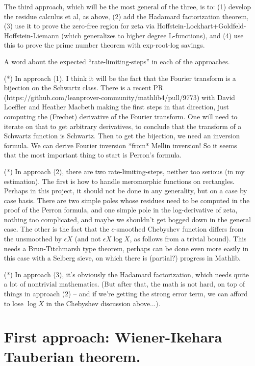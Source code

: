 The third approach, which will be the most general of the three, is to: (1) develop the residue calculus et al, as above, (2) add the Hadamard factorization theorem, (3) use it to prove the zero-free region for zeta via Hoffstein-Lockhart+Goldfeld-Hoffstein-Liemann (which generalizes to higher degree L-functions), and (4) use this to prove the prime number theorem with exp-root-log savings.

A word about the expected ``rate-limiting-steps'' in each of the approaches. 

(*) In approach (1), I think it will be the fact that the Fourier transform is a bijection on the Schwartz class. There is a recent PR (https://github.com/leanprover-community/mathlib4/pull/9773) with David Loeffler and Heather Macbeth making the first steps in that direction, just computing the (Frechet) derivative of the Fourier transform. One will need to iterate on that to get arbitrary derivatives, to conclude that the transform of a Schwartz function is Schwartz. Then to get the bijection, we need an inversion formula. We can derive Fourier inversion *from* Mellin inversion! So it seems that the most important thing to start is Perron's formula.

(*) In approach (2), there are two rate-limiting-steps, neither too serious (in my estimation). The first is how to handle meromorphic functions on rectangles. Perhaps in this project, it should not be done in any generality, but on a case by case basis. There are two simple poles whose residues need to be computed in the proof of the Perron formula, and one simple pole in the log-derivative of zeta, nothing too complicated, and maybe we shouldn't get bogged down in the general case. The other is the fact that the $\epsilon$-smoothed Chebyshev function differs from the unsmoothed by $\epsilon X$ (and not $\epsilon X \log X$, as follows from a trivial bound). This needs a Brun-Titchmarsh type theorem, perhaps can be done even more easily in this case with a Selberg sieve, on which there is (partial?) progress in Mathlib.

(*) In approach (3), it's obviously the Hadamard factorization, which needs quite a lot of nontrivial mathematics. (But after that, the math is not hard, on top of things in approach (2) -- and if we're getting the strong error term, we can afford to lose $\log X$ in the Chebyshev discussion above...).

\chapter{First approach: Wiener-Ikehara Tauberian theorem.}


